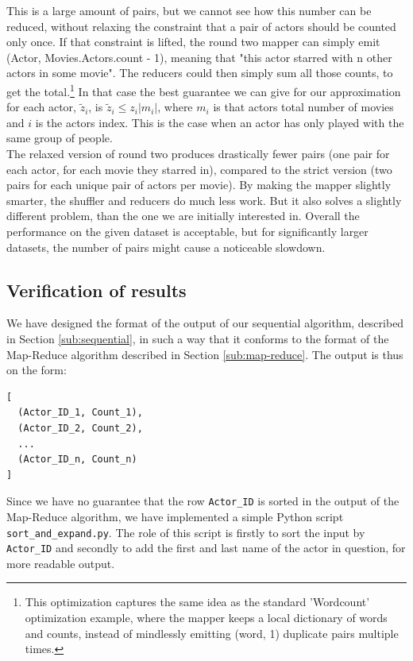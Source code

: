 \documentclass[a4paper,11pt]{article}
\begin{document}
This is a large amount of pairs, but we cannot see how this number can be reduced, without relaxing the constraint that a pair of actors should be counted only once. If that constraint is lifted, the round two mapper can simply emit (Actor, Movies.Actors.count - 1), meaning that "this actor starred with n other actors in some movie". The reducers could then simply sum all those counts, to get the total.\footnote{This optimization captures the same idea as the standard 'Wordcount' optimization example, where the mapper keeps a local dictionary of words and counts, instead of mindlessly emitting (word, 1) duplicate pairs multiple times.}
In that case the best guarantee we can give for our approximation for each actor, $\tilde{z}_i$, is $\tilde{z}_i \leq z_i |m_i|$, where $m_i$ is that actors total number of movies and $i$ is the actors index. This is the case when an actor has only played with the same group of people. 
\\

The relaxed version of round two produces drastically fewer pairs (one pair for each actor, for each movie they starred in), compared to the strict version (two pairs for each unique pair of actors per movie). By making the mapper slightly smarter, the shuffler and reducers do much less work. But it also solves a slightly different problem, than the one we are initially interested in. Overall the performance on the given dataset is acceptable, but for significantly larger datasets, the number of pairs might cause a noticeable slowdown. 


\subsection{Verification of results}
\label{sub:verification}
We have designed the format of the output of our sequential algorithm, described in Section \ref{sub:sequential}, in such a way that it conforms to the format of the Map-Reduce algorithm described in Section \ref{sub:map-reduce}. 
The output is thus on the form:
\begin{verbatim}
[ 
  (Actor_ID_1, Count_1),
  (Actor_ID_2, Count_2),
  ...
  (Actor_ID_n, Count_n)
]
\end{verbatim}
Since we have no guarantee that the row \texttt{Actor\_ID} is sorted in the output of the Map-Reduce algorithm, we have implemented a simple Python script \texttt{sort\_and\_expand.py}. 
The role of this script is firstly to sort the input by \texttt{Actor\_ID} and secondly to add the first and last name of the actor in question, for more readable output.
\end{document}
